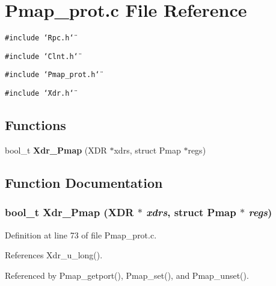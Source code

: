 \section{Pmap\_\-prot.c File Reference}
\label{Pmap__prot_8c}
{\tt \#include \char`\"{}Rpc.h\char`\"{}}\par
{\tt \#include \char`\"{}Clnt.h\char`\"{}}\par
{\tt \#include \char`\"{}Pmap\_\-prot.h\char`\"{}}\par
{\tt \#include \char`\"{}Xdr.h\char`\"{}}\par
\subsection*{Functions}
\begin{CompactItemize}
\item 
bool\_\-t {\bf Xdr\_\-Pmap} (XDR $\ast$xdrs, struct Pmap $\ast$regs)
\end{CompactItemize}


\subsection{Function Documentation}
\subsubsection{\setlength{\rightskip}{0pt plus 5cm}bool\_\-t Xdr\_\-Pmap (XDR $\ast$ {\em xdrs}, struct Pmap $\ast$ {\em regs})}\label{Pmap__prot_8c_a0}




Definition at line 73 of file Pmap\_\-prot.c.

References Xdr\_\-u\_\-long().

Referenced by Pmap\_\-getport(), Pmap\_\-set(), and Pmap\_\-unset().